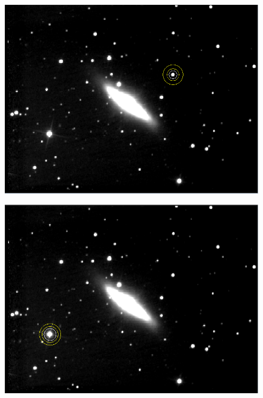 \documentclass[12pt]{article}
\begin{document}
\begin{figure}[H]
\centering
\begin{multicols}{2}
\begin{minipage}[H]{0.5\textwidth}
\includegraphics[scale=0.43]{Images/AsImages/SS/Sr1-Aperture.PNG} \\
\end{minipage}
\begin{minipage}[H]{0.5\textwidth}
\includegraphics[scale=0.43]{Images/AsImages/SS/Sr3-Aperture.PNG}
\end{minipage}
\begin{minipage}[H]{0.5\textwidth}

\end{minipage}
\end{multicols}
\end{figure}
\end{document}
